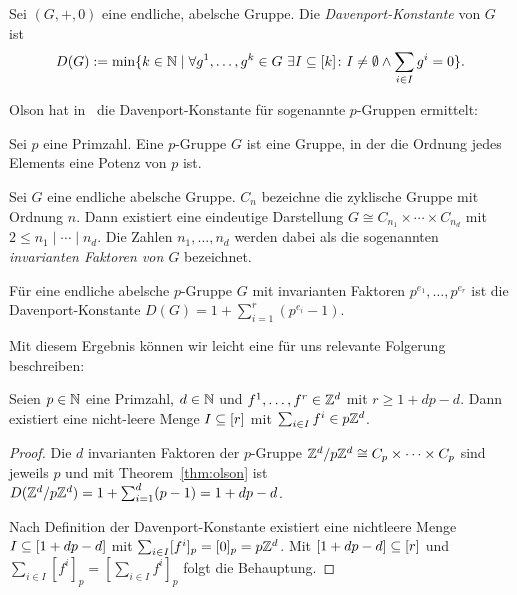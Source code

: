 \begin{definition}
	Sei $(G,+,0)$ eine endliche, abelsche Gruppe.
	Die {\em Davenport-Konstante} von $G$ ist
	$$
		D(G):=\min\{k\in\mathbb{N} \mid \forall g^1,\dots,g^k \in G~\exists I\subseteq[k]\colon I\neq\emptyset \wedge \sum_{i\in I}g^i=0  \} .
	$$
\end{definition}

Olson hat in~\cite{Olson1969} die Davenport-Konstante für sogenannte $p$-Gruppen ermittelt:
\begin{definition}[$p$-Gruppe]
	Sei $p$ eine Primzahl.
	Eine $p$-Gruppe $G$ ist eine Gruppe, in der die Ordnung jedes Elements eine Potenz von $p$ ist.
\end{definition}
\begin{theorem}
	Sei $G$ eine endliche abelsche Gruppe.
	$C_n$ bezeichne die zyklische Gruppe mit Ordnung $n$.
	Dann existiert eine eindeutige Darstellung $G\cong C_{n_1}\times\cdots\times C_{n_d}$ mit $2\leq n_1\mid\cdots\mid n_d$.
	Die Zahlen $n_1,\dots,n_d$ werden dabei als die sogenannten \emph{invarianten Faktoren von $G$} bezeichnet.
\end{theorem}

\begin{theorem}[Olson]\label{thm:olson}
	Für eine endliche abelsche $p$-Gruppe $G$ mit invarianten Faktoren $p^{e_1},\dots,p^{e_r}$ ist die Davenport-Konstante $D(G)=1+\sum_{i=1}^r(p^{e_i}-1)$.
\end{theorem}

Mit diesem Ergebnis können wir leicht eine für uns relevante Folgerung beschreiben:

\begin{corollary}\label{cor:olson}
	Seien $p\in\mathbb{N}$ eine Primzahl, $d\in\mathbb{N}$ und $f^1,\dots,f^r\in\mathbb{Z}^d$ mit $r\geq 1+dp-d$.
	Dann existiert eine nicht-leere Menge $I\subseteq[r]$ mit $\sum_{i\in I}f^i\in p\mathbb{Z}^d$.
\end{corollary}
\begin{proof}
	Die $d$ invarianten Faktoren der $p$-Gruppe $\mathbb{Z}^d/p\mathbb{Z}^d\cong C_p\times\dots\times C_p$ sind jeweils $p$ und mit Theorem~\ref{thm:olson} ist $D(\mathbb{Z}^d/p\mathbb{Z}^d)=1+\sum_{i=1}^d(p-1)=1+dp-d$.
	
	Nach Definition der Davenport-Konstante existiert eine nichtleere Menge $I\subseteq[1+dp-d]$ mit $\sum_{i\in I}[f^i]_p=[0]_p=p\mathbb{Z}^d$.
	Mit $[1+dp-d]\subseteq[r]$ und $\sum_{i\in I}[f^i]_p=[\sum_{i\in I}f^i]_p$ folgt die Behauptung.
\end{proof}

